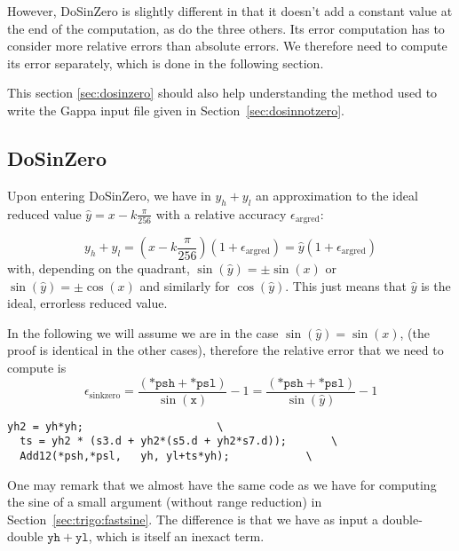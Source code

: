 However, DoSinZero is slightly different in that it doesn't add a
constant value at the end of the computation, as do the three others.
Its error computation has to consider more relative errors than
absolute errors. We therefore need to compute its error separately,
which is done in the following section.

This section \ref{sec:dosinzero} should also help understanding the
method used to write the Gappa input file given in
Section~\ref{sec:dosinnotzero}.



\subsection{DoSinZero \label{sec:dosinzero} }
Upon entering  DoSinZero, we have in
$y_h+y_l$ an approximation to the ideal reduced value
$\hat{y}=x-k\frac{\pi}{256}$ with a relative accuracy $\epsilon_{\mathrm{argred}}$:

\begin{equation}
  y_h+y_l = (x-k\frac{\pi}{256})(1+\epsilon_{\mathrm{argred}}) 
  = \hat{y}(1+\epsilon_{\mathrm{argred}})
  \label{eq:sinargrederror1}
\end{equation}
with, depending on the quadrant, $\sin(\hat{y}) = \pm\sin(x)$ or
$\sin(\hat{y}) = \pm\cos(x)$ and similarly for $\cos(\hat{y})$. This
just means that $\hat{y}$ is the ideal, errorless reduced value.


In the following we will
assume we are in the case $\sin(\hat{y}) = \sin(x)$, (the proof is
identical in the other cases), therefore the relative error that we need
to compute is
\begin{equation}
  \epsilon_{\mathrm{sinkzero}} = \frac{(\mathtt{*psh} + \mathtt{*psl})}{\sin(\mathtt{x})} -1 = \frac{(\mathtt{*psh} + \mathtt{*psl})}{\sin(\hat{y})} -1
\end{equation}


 \begin{lstlisting}[caption={DoSinZero},firstnumber=1]
  yh2 = yh*yh;					   \
  ts = yh2 * (s3.d + yh2*(s5.d + yh2*s7.d));	   \
  Add12(*psh,*psl,   yh, yl+ts*yh);	           \
\end{lstlisting}

One may remark that we almost have the same code as we have for
computing the sine of a small argument (without range reduction) in
Section~\ref{sec:trigo:fastsine}. The difference is that we have as
input a double-double $\mathtt{yh}+\mathtt{yl}$, which is itself an
inexact term.

